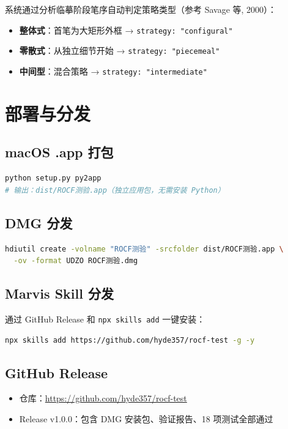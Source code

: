 \documentclass[12pt,a4paper]{ctexart}
\begin{document}
系统通过分析临摹阶段笔序自动判定策略类型（参考 Savage 等, 2000）：

\begin{itemize}[leftmargin=*]
  \item \textbf{整体式}：首笔为大矩形外框 → \texttt{strategy: "configural"}
  \item \textbf{零散式}：从独立细节开始 → \texttt{strategy: "piecemeal"}
  \item \textbf{中间型}：混合策略 → \texttt{strategy: "intermediate"}
\end{itemize}

\section{部署与分发}

\subsection{macOS .app 打包}

\begin{lstlisting}[language=bash]
python setup.py py2app
# 输出：dist/ROCF测验.app（独立应用包，无需安装 Python）
\end{lstlisting}

\subsection{DMG 分发}

\begin{lstlisting}[language=bash]
hdiutil create -volname "ROCF测验" -srcfolder dist/ROCF测验.app \
  -ov -format UDZO ROCF测验.dmg
\end{lstlisting}

\subsection{Marvis Skill 分发}

通过 GitHub Release 和 \texttt{npx skills add} 一键安装：

\begin{lstlisting}[language=bash]
npx skills add https://github.com/hyde357/rocf-test -g -y
\end{lstlisting}

\subsection{GitHub Release}

\begin{itemize}[leftmargin=*]
  \item 仓库：\url{https://github.com/hyde357/rocf-test}
  \item Release v1.0.0：包含 DMG 安装包、验证报告、18 项测试全部通过
\end{itemize}
\end{document}
